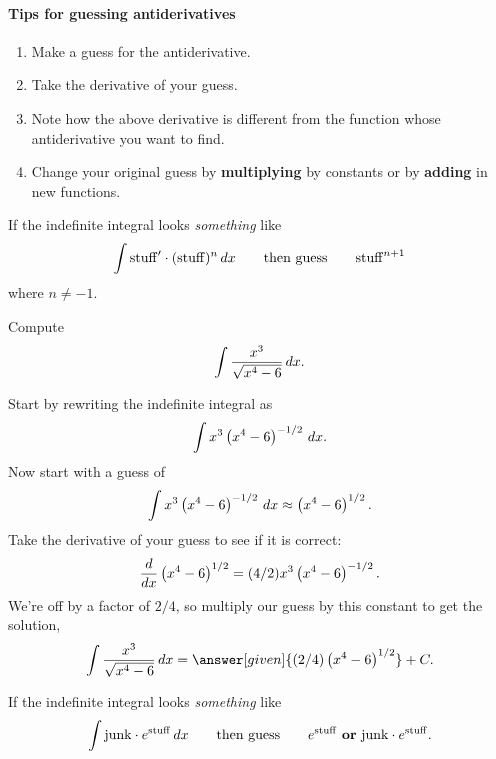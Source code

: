 \documentclass{ximera}
\begin{document}
\paragraph{Tips for guessing antiderivatives}
\begin{enumerate}
\item Make a guess for the antiderivative.
\item Take the derivative of your guess.
\item Note how the above derivative is different from the function
  whose antiderivative you want to find.
\item Change your original guess by \textbf{multiplying} by constants
  or by \textbf{adding} in new functions.
\end{enumerate}

\begin{template}\label{template:powerchain}
If the indefinite integral looks \emph{something} like
\[
\int \mathrm{stuff}' \cdot (\mathrm{stuff})^n \,d x \qquad\text{then guess} \qquad \mathrm{stuff}^{n+1}
\]
where $n\ne -1$.
\end{template}

\begin{example} Compute
\[
\int \frac{x^3}{\sqrt{x^4 -6}} \,d x.
\]
\begin{explanation}
  Start by rewriting the indefinite integral as
  \[
  \int x^3\left(x^4 -6\right)^{-1/2} \,d x.
  \]
  Now start with a guess of 
  \[
  \int x^3\left(x^4 -6\right)^{-1/2} \,d x \approx \left(x^4 -6\right)^{1/2}.
  \]
  Take the derivative of your guess to see if it is correct:
  \[
  \frac{d}{dx}  \left(x^4 -6\right)^{1/2} = (4/2)x^3\left(x^4 -6\right)^{-1/2}.
  \]
  We're off by a factor of $2/4$, so multiply our guess by this constant
  to get the solution,
  \[
  \int \frac{x^3}{\sqrt{x^4 -6}} \d x = \answer[given]{(2/4)\left(x^4 -6\right)^{1/2}}+C.
  \]
\end{explanation}
\end{example}


\begin{template}\label{template:echain}
If the indefinite integral looks \emph{something} like
\[
\int \mathrm{junk}\cdot e^{\mathrm{stuff}} \,d x \qquad\text{then
  guess}\qquad e^{\mathrm{stuff}} \text{ \textbf{or} }\mathrm{junk}
\cdot e^{\mathrm{stuff}}.
\]
\end{template}
\end{document}
